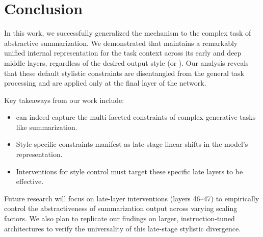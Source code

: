 \section{Conclusion}
\label{sec:conclusion}

In this work, we successfully generalized the \fv mechanism to the complex task of abstractive summarization. We demonstrated that \gpttwo maintains a remarkably unified internal representation for the task context across its early and deep middle layers, regardless of the desired output style (\extractive or \abstractive). Our analysis reveals that these default stylistic constraints are disentangled from the general task processing and are applied only at the final layer of the network.

Key takeaways from our work include:
\begin{itemize}[leftmargin=*,itemsep=0pt,topsep=0pt]
    \item \fvs can indeed capture the multi-faceted constraints of complex generative tasks like summarization.
    \item Style-specific constraints manifest as late-stage linear shifts in the model's representation.
    \item Interventions for style control must target these specific late layers to be effective.
\end{itemize}

Future research will focus on late-layer interventions (layers 46--47) to empirically control the abstractiveness of summarization output across varying scaling factors. We also plan to replicate our findings on larger, instruction-tuned architectures to verify the universality of this late-stage stylistic divergence.
